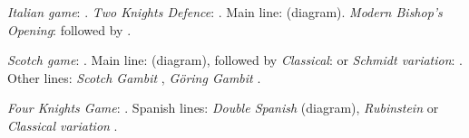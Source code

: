 \begin{minipage}[t]{.175\linewidth}
\raggedright
\begin{center}
\scalebox{.560}{\showboard}
\end{center}
\newgame
\emph{Italian game}: .
\emph{Two Knights Defence}: .
Main line:  (diagram).
\emph{Modern Bishop’s Opening}:  followed by .
\vspace{2mm}
\end{minipage}
\hspace{5mm}
\begin{minipage}[t]{.175\linewidth}
\raggedright
\begin{center}
\scalebox{.560}{\showboard}
\end{center}
\newgame
\emph{Scotch game}: .
Main line:  (diagram), followed by \emph{Classical}:  or \emph{Schmidt variation}: .
Other lines: \emph{Scotch Gambit} , \emph{Göring Gambit} .
\vspace{2mm}
\end{minipage}
\newline
\begin{minipage}[t]{.175\linewidth}
\raggedright
\begin{center}
\scalebox{.560}{\showboard}
\end{center}
\newgame
\emph{Four Knights Game}: .
Spanish lines: \emph{Double Spanish}  (diagram), \emph{Rubinstein}  or \emph{Classical variation} .
\vspace{2mm}
\end{minipage}
